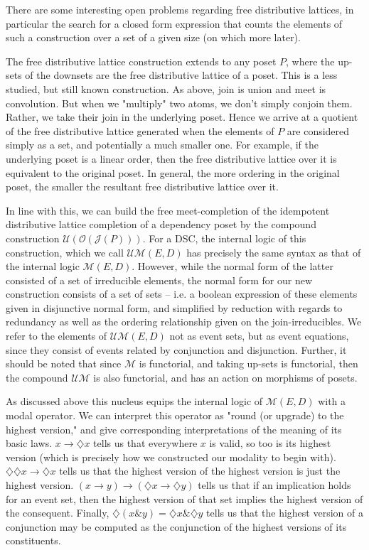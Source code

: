 \documentclass[hoptionsi,review,format=acmsmall]{acmart}
\theoremstyle{definition}
\newcommand{\Mcc}{\mathcal{M}}
\newcommand{\UMc}{\mathcal{UM}}
\newcommand{\Oc}{\mathcal{O}}
\newcommand{\Uc}{\mathcal{U}}
\newcommand{\Jc}{\mathcal{J}}
\newcommand{\band}{\mathbin{\&}}
\newcommand{\Dia}{\diamondsuit}
\begin{document}
There are some interesting open problems regarding free distributive lattices, in particular the search for a closed form expression that counts the elements of such a construction over a set of a given size (on which more later).

The free distributive lattice construction extends to any poset \(P\), where the up-sets of the downsets are the free distributive lattice of a poset. This is a less studied, but still known construction. As above, join is union and meet is convolution. But when we "multiply" two atoms, we don't simply conjoin them. Rather, we take their join in the underlying poset. Hence we arrive at a quotient of the free distributive lattice generated when the elements of \(P\) are considered simply as a set, and potentially a much smaller one. For example, if the underlying poset is a linear order, then the free distributive lattice over it is equivalent to the original poset. In general, the more ordering in the original poset, the smaller the resultant free distributive lattice over it.

 In line with this, we can build the free meet-completion of the idempotent distributive lattice completion of a dependency poset by the compound construction \(\Uc(\Oc(\Jc(P)))\). For a DSC, the internal logic of this construction, which we call \(\UMc(E,D)\) has precisely the same syntax as that of the internal logic \(\Mcc(E,D)\). However, while the normal form of the latter consisted of a set of irreducible elements, the normal form for our new construction consists of a set of sets -- i.e. a boolean expression of these elements given in disjunctive normal form, and simplified by reduction with regards to redundancy as well as the ordering relationship given on the join-irreducibles. We refer to the elements of \(\UMc(E,D)\) not as event sets, but as event equations, since they consist of events related by conjunction and disjunction. Further, it should be noted that since \(\Mcc\) is functorial, and taking up-sets is functorial, then the compound \(\UMc\) is also functorial, and has an action on morphisms of posets.
 



As discussed above this nucleus equips the internal logic of \(\Mcc(E,D)\) with a modal operator. We can interpret this operator as "round (or upgrade) to the highest version," and give corresponding interpretations of the meaning of its basic laws. \(x \rightarrow \Dia{x}\) tells us that everywhere \(x\) is valid, so too is its highest version (which is precisely how we constructed our modality to begin with). \(\Dia\Dia{x} \rightarrow \Dia{x}\) tells us that the highest version of the highest version is just the highest version. \((x \rightarrow y) \rightarrow (\Dia{x} \rightarrow \Dia{y})\)  tells us that if an implication holds for an event set, then the highest version of that set implies the highest version of the consequent. Finally, \(\Dia(x \band y) = \Dia{x} \band \Dia{y}\) tells us that the highest version of a conjunction may be computed as the conjunction of the highest versions of its constituents.
\end{document}
